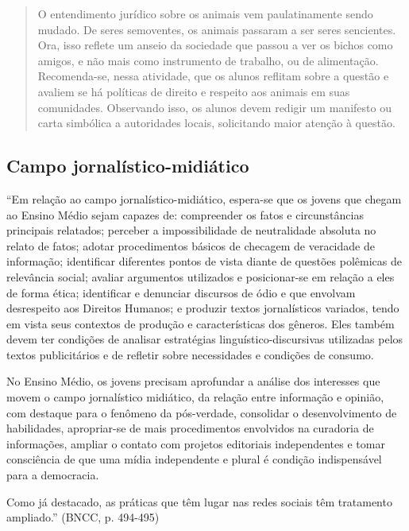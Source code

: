 \documentclass[12pt]{extarticle}
\begin{document}
\begin{quote} O entendimento jurídico sobre os animais vem paulatinamente sendo
  mudado. De seres semoventes, os animais passaram a ser seres sencientes.
  Ora, isso reflete um anseio da sociedade que passou a ver os bichos como
  amigos, e não mais como instrumento de trabalho, ou de alimentação.
  Recomenda-se, nessa atividade, que os alunos reflitam sobre a questão
  e avaliem se há políticas de direito e respeito aos animais em suas
  comunidades. Observando isso, os alunos devem redigir um manifesto ou carta
simbólica a autoridades locais, solicitando maior atenção à questão.
\end{quote}

\subsection{Campo jornalístico-midiático }

``Em relação ao campo jornalístico-midiático, espera-se que os jovens que
chegam ao Ensino Médio sejam capazes de: compreender os fatos e circunstâncias
principais relatados; perceber a impossibilidade de neutralidade absoluta no
relato de fatos; adotar procedimentos básicos de checagem de veracidade de
informação; identificar diferentes pontos de vista diante de questões polêmicas
de relevância social; avaliar argumentos utilizados e posicionar-se em relação
a eles de forma ética; identificar e denunciar discursos de ódio e que envolvam
desrespeito aos Direitos Humanos; e produzir textos jornalísticos variados,
tendo em vista seus contextos de produção e características dos gêneros. Eles
também devem ter condições de analisar estratégias linguístico-discursivas
utilizadas pelos textos publicitários e de refletir sobre necessidades
e condições de consumo.

No Ensino Médio, os jovens precisam aprofundar a análise dos interesses que
movem o campo jornalístico midiático, da relação entre informação e opinião,
com destaque para o fenômeno da pós-verdade, consolidar o desenvolvimento de
habilidades, apropriar-se de mais procedimentos envolvidos na curadoria de
informações, ampliar o contato com projetos editoriais independentes e tomar
consciência de que uma mídia independente e plural é condição indispensável
para a democracia.

Como já destacado, as práticas que têm lugar nas redes sociais têm tratamento
ampliado.'' (BNCC, p. 494-495)
\end{document}
